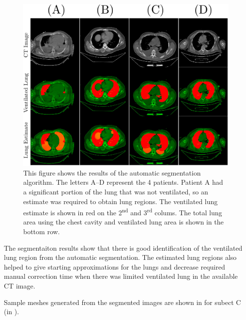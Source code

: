 \begin{figure}
	\centering
	\includegraphics[width=\textwidth]{chapter5-CT_to_mesh/imgs/lung_segmentation_results.pdf}
	\caption[Lung segmentation results]{\label{fig:lung-seg-results}%
	This figure shows the results of the automatic segmentation algorithm. The letters A--D 
	represent the 4 patients. Patient A had a significant portion of the lung that was not
	ventilated, so an estimate was required to obtain lung regions. The ventilated lung estimate
	is shown in red on the 2\textsuperscript{nd} and 3\textsuperscript{rd} colums.
	The total lung area using the chest cavity and ventilated lung area is shown in the
	bottom row.}
\end{figure}

The segmentaiton results show that there is good identification of the
ventilated lung region from the automatic segmentation. The estimated lung regions also helped to 
give starting approximations for the lungs and decrease required manual 
correction time when there was limited ventilated lung in the available CT image.

Sample meshes generated from the segmented images are shown in  
for subect C (in ).

